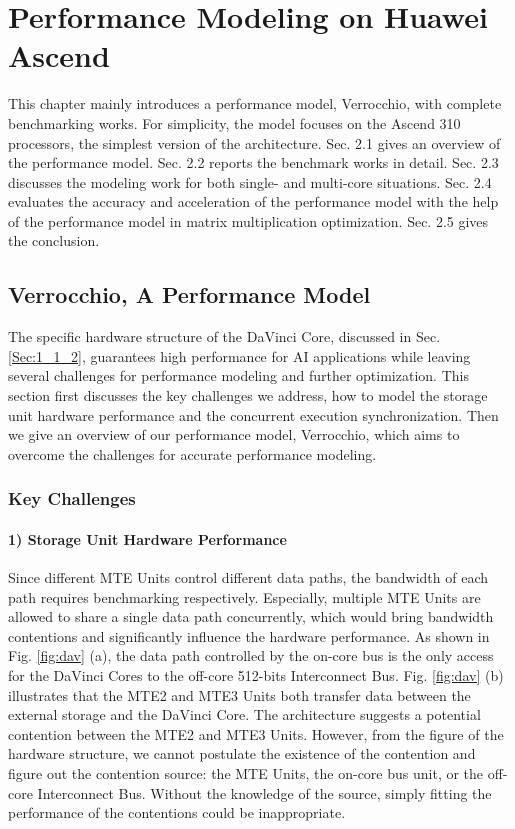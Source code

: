
\chapter{Performance Modeling on Huawei Ascend}
\label{sec_2}

This chapter mainly introduces a performance model, Verrocchio, with complete benchmarking works. For simplicity, the model focuses on the Ascend 310 processors, the simplest version of the architecture. Sec. 2.1 gives an overview of the performance model. Sec. 2.2 reports the benchmark works in detail. Sec. 2.3 discusses the modeling work for both single- and multi-core situations. Sec. 2.4 evaluates the accuracy and acceleration of the performance model with the help of the performance model in matrix multiplication optimization. Sec. 2.5 gives the conclusion.

\section{Verrocchio, A Performance Model}
\label{sec_2_1}

The specific hardware structure of the DaVinci Core, discussed in Sec. \ref{Sec:1_1_2}, guarantees high performance for AI applications while leaving several challenges for performance modeling and further optimization. This section first discusses the key challenges we address, how to model the storage unit hardware performance and the concurrent execution synchronization. Then we give an overview of our performance model, Verrocchio, which aims to overcome the challenges for accurate performance modeling.

\subsection{Key Challenges}

\subsubsection{1) Storage Unit Hardware Performance}

Since different MTE Units control different data paths, the bandwidth of each path requires benchmarking respectively. Especially, multiple MTE Units are allowed to share a single data path concurrently, which would bring bandwidth contentions and significantly influence the hardware performance. As shown in Fig. \ref{fig:dav} (a), the data path controlled by the on-core bus is the only access for the DaVinci Cores to the off-core 512-bits Interconnect Bus. Fig. \ref{fig:dav} (b) illustrates that the MTE2 and MTE3 Units both transfer data between the external storage and the DaVinci Core. The architecture suggests a potential contention between the MTE2 and MTE3 Units. However, from the figure of the hardware structure, we cannot postulate the existence of the contention and figure out the contention source: the MTE Units, the on-core bus unit, or the off-core Interconnect Bus. Without the knowledge of the source, simply fitting the performance of the contentions could be inappropriate.

